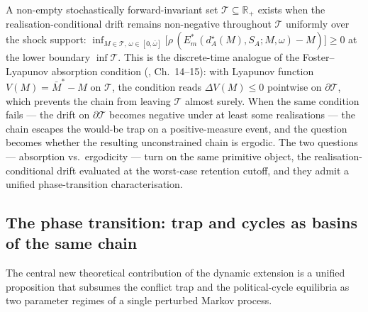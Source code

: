 \documentclass[11pt,twoside]{extarticle}
\begin{document}
A non-empty stochastically forward-invariant set $\mathcal T\subseteq\mathbb R_+$ exists when the realisation-conditional drift remains non-negative throughout $\mathcal T$ uniformly over the shock support: $\inf_{M\in\mathcal T,\,\omega\in[0,\bar\omega]}\big[\rho\,(E_m^*(d_A^\star(M),S_A;M,\omega)-M)\big]\ge 0$ at the lower boundary $\inf\mathcal T$. This is the discrete-time analogue of the Foster–Lyapunov absorption condition (\citealp{meynMarkovChainsStochastic2012}, Ch.~14–15): with Lyapunov function $V(M)=\bar M^*-M$ on $\mathcal T$, the condition reads $\Delta V(M)\le 0$ pointwise on $\partial\mathcal T$, which prevents the chain from leaving $\mathcal T$ almost surely. When the same condition fails — the drift on $\partial\mathcal T$ becomes negative under at least some realisations — the chain escapes the would-be trap on a positive-measure event, and the question becomes whether the resulting unconstrained chain is ergodic. The two questions — absorption vs.\ ergodicity — turn on the same primitive object, the realisation-conditional drift evaluated at the worst-case retention cutoff, and they admit a unified phase-transition characterisation.

\subsection{The phase transition: trap and cycles as basins of the same chain}\label{sec:phase_v2}

The central new theoretical contribution of the dynamic extension is a unified proposition that subsumes the conflict trap and the political-cycle equilibria as two parameter regimes of a single perturbed Markov process.
\end{document}
